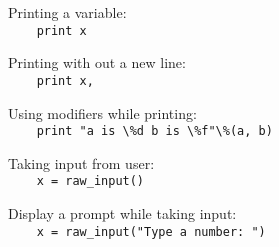 Printing a variable:\\
{\ex \lstinline|    print x|}

Printing with out a new line:\\
{\ex \lstinline|    print x, |}

Using modifiers while printing:\\
{\ex \lstinline|    print "a is \%d b is \%f"\%(a, b)|}

Taking input from user:\\
{\ex \lstinline|    x = raw_input()|}

Display a prompt while taking input:\\
{\ex \lstinline|    x = raw_input("Type a number: ")|}

